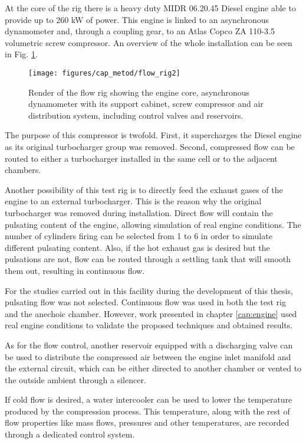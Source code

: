 At the core of the rig there is a heavy duty MIDR 06.20.45 Diesel engine able to provide up to 260 kW of power. This engine is linked to an asynchronous dynamometer and, through a coupling gear, to an Atlas Copco ZA 110-3.5 volumetric screw compressor. An overview of the whole installation can be seen in Fig. \ref{fig:flowrig_render}.

\begin{figure}[b!]
\centering
\texttt{[image: figures/cap\_metod/flow\_rig2]}
\caption[Render of the flow rig used to power the turbocharger]{Render of the flow rig showing the engine core, asynchronous dynamometer with its support cabinet, screw compressor and air distribution system, including control valves and reservoirs.}
\label{fig:flowrig_render}
\end{figure}

The purpose of this compressor is twofold. First, it supercharges the Diesel engine as its original turbocharger group was removed. Second, compressed flow can be routed to either a turbocharger installed in the same cell or to the adjacent chambers.

Another possibility of this test rig is to directly feed the exhaust gases of the engine to an external turbocharger. This is the reason why the original turbocharger was removed during installation. Direct flow will contain the pulsating content of the engine, allowing simulation of real engine conditions.
The number of cylinders firing can be selected from 1 to 6 in order to simulate different pulsating content. Also, if the hot exhaust gas is desired but the pulsations are not, flow can be routed through a settling tank that will smooth them out, resulting in continuous flow.

For the studies carried out in this facility during the development of this thesis, pulsating flow was not selected. Continuous flow was used in both the test rig and the anechoic chamber. However, work presented in chapter \ref{cap:engine} used real engine conditions to validate the proposed techniques and obtained results.

As for the flow control, another reservoir equipped with a discharging valve can be used to distribute the compressed air between the engine inlet manifold and the external circuit, which can be either directed to another chamber or vented to the outside ambient through a silencer.

If cold flow is desired, a water intercooler can be used to lower the temperature produced by the compression process. This temperature, along with the rest of flow properties like mass flows, pressures and other temperatures, are recorded through a dedicated control system.

